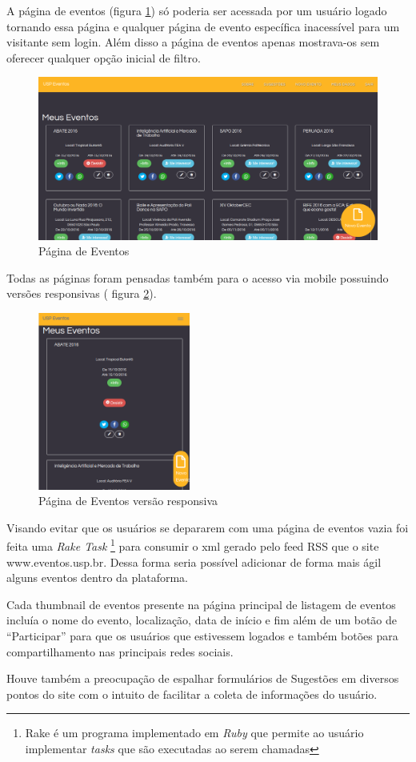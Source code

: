 		\par A página de eventos (figura \ref{fig:events_pagev1}) só poderia ser acessada por um usuário logado tornando essa página e qualquer página de evento específica inacessível para um visitante sem login. Além disso a página de eventos apenas mostrava-os sem oferecer qualquer opção inicial de filtro.
        \begin{figure}[htb]
		\includegraphics[width=15cm]{figuras/events_pagev1}
		\caption{\label{fig:events_pagev1} Página de Eventos}
		\end{figure}
\par Todas as páginas foram pensadas também para o acesso via mobile possuindo versões responsivas ( figura \ref{fig:events_pagev1_responsive}).
        \begin{figure}[htb]
		\includegraphics[width=5cm]{figuras/events_pagev1_responsive}
		\caption{\label{fig:events_pagev1_responsive} Página de Eventos versão responsiva}
		\end{figure}
\par Visando evitar que os usuários se depararem com uma página de eventos vazia foi feita uma \emph{Rake Task} \footnote{Rake é um programa implementado em \emph{Ruby} que permite ao usuário implementar \emph{tasks} que são executadas ao serem chamadas} para consumir o xml gerado pelo feed RSS que o site www.eventos.usp.br. Dessa forma seria possível adicionar de forma mais ágil alguns eventos dentro da plataforma.
\par Cada thumbnail de eventos presente na página principal de listagem de eventos incluía o nome do evento, localização, data de início e fim além de um botão de ``Participar'' para que os usuários que estivessem logados e também botões para compartilhamento nas principais redes sociais.
\par Houve também a preocupação de espalhar formulários de Sugestões em diversos pontos do site com o intuito de facilitar a coleta de informações do usuário.
